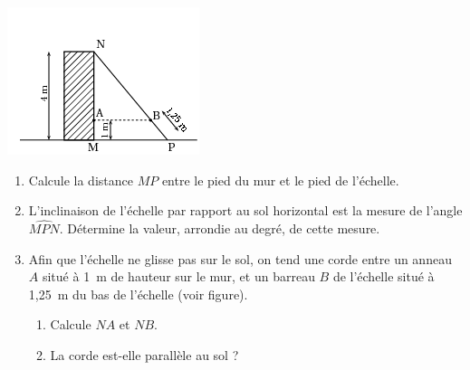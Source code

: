 
\begin{minipage}{6.5cm}
	\includegraphics[scale=1]{TR-214.png} 
\end{minipage}
\begin{minipage}{11cm}
	\begin{enumerate}
		\item Calcule la distance $MP$ entre le pied du mur et le pied de l'échelle.
		\item L'inclinaison de l'échelle par rapport au sol horizontal est la mesure de l'angle $\widehat{MPN}$. Détermine la valeur, arrondie au degré, de cette mesure.
		\item Afin que l'échelle ne glisse pas sur le sol, on tend une corde entre un anneau $A$ situé à 1~m de hauteur sur le mur, et un barreau $B$ de l'échelle situé à 1,25~m du bas de l'échelle (voir figure).
		\begin{enumerate}
			\item Calcule $NA$ et $NB$.
			\item La corde est-elle parallèle au sol ?
		\end{enumerate}
	\end{enumerate}
\end{minipage}
